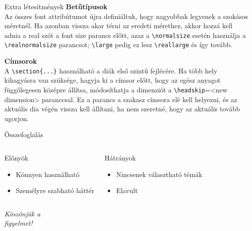 \documentclass{beamer}
\begin{document}
\begin{frame}[fragile]{Extra létesítmények}
\large \textbf{Betűtípusok} \\
\normalsize
Az összes font attribútumot újra definiáltuk, hogy nagyobbak legyenek a szokásos méretnél.
Ha azonban vissza akar térni az eredeti mérethez, akkor hozzá kell adnia a real szót a font size parancs előtt, azaz a \color{red}\verb|\normalsize| \color{black}esetén használja a \color{red}\verb|\realnormalsize| \color{black}parancsot; \color{red}\verb|\large| \color{black}pedig ez lesz \color{red}\verb|\reallarge| \color{black}és így tovább.

\large \textbf{Címsorok} \\
\normalsize
A \color{red}\verb|\section{...}| \color{black}használható a diák első szintű fejlécére. Ha több hely kihagyásra van szüksége, hagyja ki a címsor előtt, hogy az egész anyagot függőlegesen középre állítsa, módosíthatja a dimenziót a \color{red}\verb|\headskip|={<new dimension>} \color{black} paranccsal. Ez a parancs a szakasz címsora elé kell helyezni, és az aktuális dia végén vissza kell állítani, ha nem szeretné, hogy az aktuális tovább ugorjon.


\end{frame}


\begin{frame}[fragile]{Összefoglalás}
\begin{columns}[T]
\begin{block}{\color{green}Előnyök}
\begin{itemize}
\item Könnyen használható
\item Személyre szabható háttér
\end{itemize}

\end{block}
\begin{block}{\color{red}Hátrányok}

\begin{itemize}
\item Nincsenek választható témák
\item Elavult
\end{itemize}
\end{block}

\end{columns}
\end{frame}



\begin{frame}
\centering \Large
  \emph{Köszönjük a \\ figyelmet!}
\end{frame}
\end{document}
